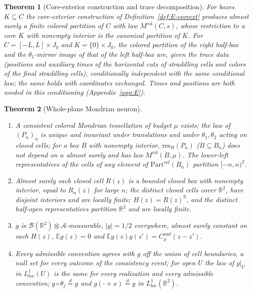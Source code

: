 \documentclass[11pt]{article}
\theoremstyle{plain}
\newtheorem{theorem}{Theorem}[section]
\theoremstyle{definition}
\theoremstyle{remark}
\newcommand{\R}{\mathbb{R}}
\newcommand{\E}{\mathbb{E}}
\newcommand{\cB}{\mathcal{B}}
\newcommand{\cA}{\mathcal{A}}
\newcommand{\Cend}{C^{\mathrm{end}}_{\mu}}
\newcommand{\Part}{\mathrm{Part}}
\newcommand{\Mcol}{M^{\mathrm{col}}}
\newcommand{\resB}{\mathrm{res}}
\begin{document}
\begin{theorem}[Core-exterior construction and trace decomposition]\label{thm:E-trace}
For boxes $K\subseteq C$ the core-exterior construction of
Definition~\ref{def:E-coreext} produces almost surely a finite colored partition
of $C$ with law $\Mcol(C,s)$, whose restriction to a core $K$ with nonempty
interior is the canonical partition of $K$. For $C=[-L,L]\times J_0$ and
$K=\{0\}\times J_0$, the colored partition of the right half-box and the
$\theta_1$-mirror image of that of the left half-box are, given the trace data
(positions and auxiliary times of the horizontal cuts of straddling cells and
colors of the final straddling cells), conditionally independent with the same
conditional law; the same holds with coordinates exchanged. Times and positions
are both needed in this conditioning (Appendix~\ref{app:E}).
\end{theorem}

\begin{theorem}[Whole-plane Mondrian neuron]\label{thm:E-plane}
\begin{enumerate}[label=(\alph*)]
\item A consistent colored Mondrian tessellation of budget $\mu$ exists; the law
  of $(P_n)_n$ is unique and invariant under translations and under
  $\theta_1,\theta_2$ acting on closed cells; for a box $B$ with nonempty interior,
  $\resB_B(P_n)$ ($B\subseteq B_n$) does not depend on $n$ almost surely and has law
  $\Mcol(B,\mu)$. The lower-left representatives of the cells of any element of
  $\Part^{\mathrm{col}}(B_n)$ partition $[-n,n)^{2}$.
\item Almost surely each closed cell $R(z)$ is a bounded closed box with nonempty
  interior, equal to $R_n(z)$ for large $n$; the distinct closed cells cover
  $\R^{2}$, have disjoint interiors and are locally finite; $H(z)=R(z)^{\mathrm{ll}}$,
  and the distinct half-open representatives partition $\R^{2}$ and are locally
  finite.
\item $g$ is $\cB(\R^{2})\otimes\cA$-measurable, $|g|=1/2$ everywhere, almost surely
  constant on each $H(z)$, $\E g(z)=0$ and $\E g(z)g(z')=\Cend(z-z')$.
\item Every admissible convention agrees with $g$ off the union of cell
  boundaries, a null set for every outcome of the consistency event; for open
  $U$ the law of $g|_U$ in $L^{1}_{\mathrm{loc}}(U)$ is the same for every realization
  and every admissible convention; $g\circ\theta_j\overset{d}{=}g$ and
  $g(\cdot+x)\overset{d}{=}g$ in $L^{1}_{\mathrm{loc}}(\R^{2})$.
\end{enumerate}
\end{theorem}
\end{document}
